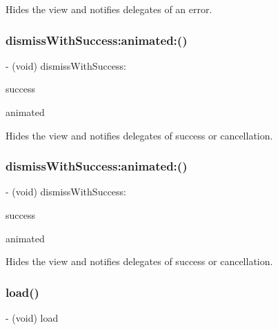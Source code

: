 Hides the view and notifies delegates of an error. \mbox{\label{interfaceFBDialog_a5250f7dbf293b91efbc498cd980ea629}} 
\subsubsection{\texorpdfstring{dismiss\+With\+Success\+:animated\+:()}{dismissWithSuccess:animated:()}\hspace{0.1cm}{\footnotesize\ttfamily [1/2]}}
{\footnotesize\ttfamily -\/ (void) dismiss\+With\+Success\+: \begin{DoxyParamCaption}\item[{(B\+O\+OL)}]{success }\item[{animated:(B\+O\+OL)}]{animated }\end{DoxyParamCaption}}

Hides the view and notifies delegates of success or cancellation. \mbox{\label{interfaceFBDialog_a5250f7dbf293b91efbc498cd980ea629}} 
\subsubsection{\texorpdfstring{dismiss\+With\+Success\+:animated\+:()}{dismissWithSuccess:animated:()}\hspace{0.1cm}{\footnotesize\ttfamily [2/2]}}
{\footnotesize\ttfamily -\/ (void) dismiss\+With\+Success\+: \begin{DoxyParamCaption}\item[{(B\+O\+OL)}]{success }\item[{animated:(B\+O\+OL)}]{animated }\end{DoxyParamCaption}}

Hides the view and notifies delegates of success or cancellation. \mbox{\label{interfaceFBDialog_a41ca6458674d1701e6e1d143d5aeb972}} 
\subsubsection{\texorpdfstring{load()}{load()}\hspace{0.1cm}{\footnotesize\ttfamily [1/2]}}
{\footnotesize\ttfamily -\/ (void) load \begin{DoxyParamCaption}{ }\end{DoxyParamCaption}}

